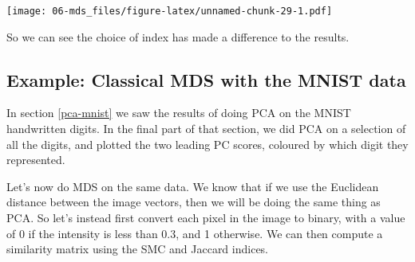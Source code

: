 \documentclass[]{book}
\newenvironment{Shaded}{\begin{snugshade}}{\end{snugshade}}
\newcommand{\CommentTok}[1]{\textcolor[rgb]{0.56,0.35,0.01}{\textit{#1}}}
\newcommand{\DataTypeTok}[1]{\textcolor[rgb]{0.13,0.29,0.53}{#1}}
\newcommand{\DecValTok}[1]{\textcolor[rgb]{0.00,0.00,0.81}{#1}}
\newcommand{\FloatTok}[1]{\textcolor[rgb]{0.00,0.00,0.81}{#1}}
\newcommand{\KeywordTok}[1]{\textcolor[rgb]{0.13,0.29,0.53}{\textbf{#1}}}
\newcommand{\NormalTok}[1]{#1}
\newcommand{\OperatorTok}[1]{\textcolor[rgb]{0.81,0.36,0.00}{\textbf{#1}}}
\newcommand{\OtherTok}[1]{\textcolor[rgb]{0.56,0.35,0.01}{#1}}
\newcommand{\StringTok}[1]{\textcolor[rgb]{0.31,0.60,0.02}{#1}}
\theoremstyle{definition}
\theoremstyle{definition}
\theoremstyle{definition}
\theoremstyle{remark}
\begin{document}
\texttt{[image: 06-mds\_files/figure-latex/unnamed-chunk-29-1.pdf]}

So we can see the choice of index has made a difference to the results.

\hypertarget{example-classical-mds-with-the-mnist-data}{%
\subsection{Example: Classical MDS with the MNIST data}\label{example-classical-mds-with-the-mnist-data}}

In section \ref{pca-mnist} we saw the results of doing PCA on the MNIST handwritten digits. In the final part of that section, we did PCA on a selection of all the digits, and plotted the two leading PC scores, coloured by which digit they represented.

Let's now do MDS on the same data. We know that if we use the Euclidean distance between the image vectors, then we will be doing the same thing as PCA. So let's instead first convert each pixel in the image to binary, with a value of 0 if the intensity is less than 0.3, and 1 otherwise. We can then compute a similarity matrix using the SMC and Jaccard indices.

\begin{Shaded}
\end{Shaded}
\end{document}
